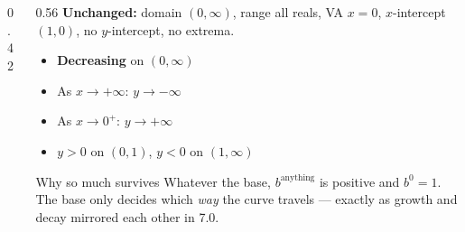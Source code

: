 \documentclass[aspectratio=169, 11pt]{beamer}
\newcommand{\lgrid}[4]{%
  \draw[step=1, linegray!45, thin] (#1,#3) grid (#2,#4);
  \draw[->, thick, charcoal] (#1,0)--(#2,0) node[below right, font=\tiny]{$x$};
  \draw[->, thick, charcoal] (0,#3)--(0,#4) node[left, font=\tiny]{$y$};}
\newcommand{\logcurve}[5]{\draw[very thick, forest, domain=#4:#5, samples=120, smooth]
  plot ({pow(#1,\x-(#3))+(#2)},{\x});}
\begin{document}
\begin{frame}[t, plain]
  \begin{columns}[T]
    \begin{column}{0.42\textwidth}
      \centering
    \end{column}
    \begin{column}{0.56\textwidth}
      \footnotesize
      \textbf{Unchanged:} domain $(0,\infty)$, range all reals, VA $x=0$, $x$-intercept $(1,0)$,
      no $y$-intercept, no extrema.
      \vspace{4pt}
      \begin{itemize}\setlength{\itemsep}{3pt}
        \item \textbf{Decreasing} on $(0,\infty)$
        \item As $x\to+\infty$: $y\to-\infty$
        \item As $x\to 0^{+}$: $y\to+\infty$
        \item $y>0$ on $(0,1)$, \; $y<0$ on $(1,\infty)$
      \end{itemize}
      \vspace{2pt}
      \begin{block}{Why so much survives}
        Whatever the base, $b^{\text{anything}}$ is positive and $b^0=1$. The base only decides which
        \emph{way} the curve travels --- exactly as growth and decay mirrored each other in 7.0.
      \end{block}
    \end{column}
  \end{columns}
\end{frame}
\end{document}
